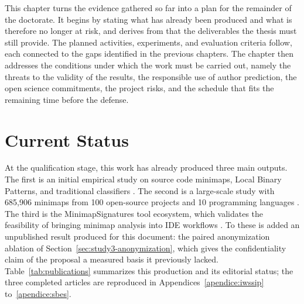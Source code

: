 This chapter turns the evidence gathered so far into a plan for the remainder of
the doctorate. It begins by stating what has already been produced and what is
therefore no longer at risk, and derives from that the deliverables the thesis
must still provide. The planned activities, experiments, and evaluation criteria
follow, each connected to the gaps identified in the previous chapters. The
chapter then addresses the conditions under which the work must be carried out,
namely the threats to the validity of the results, the responsible use of author
prediction, the open science commitments, the project risks, and the schedule
that fits the remaining time before the defense.

\section{Current Status}

At the qualification stage, this work has already produced three
main outputs. The first is an initial empirical study on source code minimaps,
Local Binary Patterns, and traditional classifiers \cite{gebara2025iwssip}. The
second is a large-scale study with 685,906 minimaps from 100 open-source
projects and 10 programming languages \cite{gebara2025ciarp}. The third is the
MinimapSignatures tool ecosystem, which validates the feasibility of bringing
minimap analysis into IDE workflows \cite{gebara2026minimapsignatures}. To these
is added an unpublished result produced for this document: the paired
anonymization ablation of Section~\ref{sec:study3-anonymization}, which gives
the confidentiality claim of the proposal a measured basis it previously
lacked.
Table~\ref{tab:publications} summarizes this production and its editorial
status; the three completed articles are reproduced in
Appendices~\ref{apendice:iwssip} to~\ref{apendice:sbes}.

